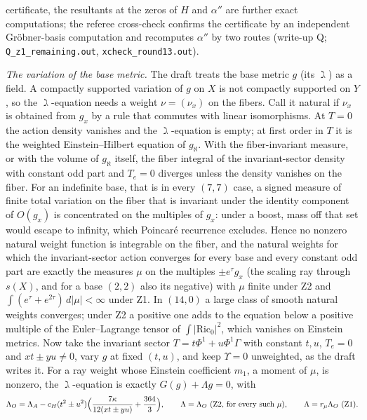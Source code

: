 \documentclass[11pt]{article}
\theoremstyle{remark}
\begin{document}
certificate, the resultants at the zeros of $H$ and $\alpha''$ are further exact computations; the referee cross-check confirms the certificate by an independent Gr\"obner-basis computation and recomputes $\alpha''$ by two routes (write-up Q; \texttt{Q\_z1\_remaining.out}, \texttt{xcheck\_round13.out}).

\emph{The variation of the base metric.} The draft treats the base metric $g$ (its $\gimel$) as a field. A compactly supported variation of $g$ on $X$ is not compactly supported on $Y$, so the $\gimel$-equation needs a weight $\nu=(\nu_x)$ on the fibers. Call it natural if $\nu_x$ is obtained from $g_x$ by a rule that commutes with linear isomorphisms. At $T=0$ the action density vanishes and the $\gimel$-equation is empty; at first order in $T$ it is the weighted Einstein--Hilbert equation of $g_\aleph$. With the fiber-invariant measure, or with the volume of $g_\aleph$ itself, the fiber integral of the invariant-sector density with constant odd part and $T_e=0$ diverges unless the density vanishes on the fiber. For an indefinite base, that is in every $(7,7)$ case, a signed measure of finite total variation on the fiber that is invariant under the identity component of $O(g_x)$ is concentrated on the multiples of $g_x$: under a boost, mass off that set would escape to infinity, which Poincar\'e recurrence excludes. Hence no nonzero natural weight function is integrable on the fiber, and the natural weights for which the invariant-sector action converges for every base and every constant odd part are exactly the measures $\mu$ on the multiples $\pm e^\tau g_x$ (the scaling ray through $s(X)$, and for a base $(2,2)$ also its negative) with $\mu$ finite under Z2 and $\int(e^\tau+e^{2\tau})\,d|\mu|<\infty$ under Z1. In $(14,0)$ a large class of smooth natural weights converges; under Z2 a positive one adds to the equation below a positive multiple of the Euler--Lagrange tensor of $\int|\mathrm{Ric}_0|^2$, which vanishes on Einstein metrics. Now take the invariant sector $T=t\Phi^1+u\Phi^1\Gamma$ with constant $t,u$, $T_e=0$ and $xt\pm yu\neq0$, vary $g$ at fixed $(t,u)$, and keep $\Upsilon=0$ unweighted, as the draft writes it. For a ray weight whose Einstein coefficient $m_1$, a moment of $\mu$, is nonzero, the $\gimel$-equation is exactly $G(g)+\Lambda g=0$, with
\[ \Lambda_O=\Lambda_A-c_H(t^2\pm u^2)\Bigl(\frac{7\kappa}{12(xt\pm yu)}+\frac{364}3\Bigr),\qquad \Lambda=\Lambda_O\ \text{(Z2, for every such }\mu),\qquad \Lambda=r_\mu\Lambda_O\ \text{(Z1)}. \]
\end{document}
